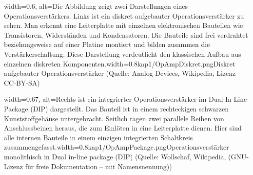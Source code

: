 \begin{frame}
{        %
        \begin{minipage}[t]{0.5\textwidth}
            \f{width=0.6\textwidth, alt={Die Abbildung zeigt zwei Darstellungen eines Operationsverstärkers. Links ist ein diskret aufgebauter Operationsverstärker zu sehen. Man erkennt eine Leiterplatte mit einzelnen elektronischen Bauteilen wie Transistoren, Widerständen und Kondensatoren. Die Bauteile sind frei verdrahtet beziehungsweise auf einer Platine montiert und bilden zusammen die Verstärkerschaltung. Diese Darstellung verdeutlicht den klassischen Aufbau aus einzelnen diskreten Komponenten.}}{width=0.8\textwidth}{kap1/OpAmpDiskret.png}{Diskret aufgebauter Operationsverstärker {\tiny(Quelle: Analog Devices, Wikipedia, Lizenz CC-BY-SA)}} %
        \end{minipage}
        \begin{minipage}[t]{0.5\textwidth}
            \f{width=0.67\textwidth, alt={Rechts ist ein integrierter Operationsverstärker im Dual-In-Line-Package (DIP) dargestellt. Das Bauteil ist in einem rechteckigen schwarzen Kunststoffgehäuse untergebracht. Seitlich ragen zwei parallele Reihen von Anschlussbeinen heraus, die zum Einlöten in eine Leiterplatte dienen. Hier sind alle internen Bauteile in einem einzigen integrierten Schaltkreis zusammengefasst.}}{width=0.8\textwidth}{kap1/OpAmpPackage.png}{Operationsverstärker monolithisch in Dual in-line package (DIP) {\tiny(Quelle: Wollschaf, Wikipedia, (GNU-Lizenz für freie Dokumentation – mit Namensnennung))}} %
        \end{minipage}
    }


\end{frame}
